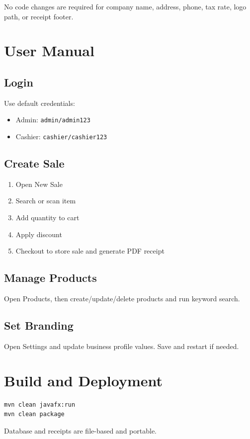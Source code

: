 \documentclass[12pt]{article}
\begin{document}
No code changes are required for company name, address, phone, tax rate, logo path, or receipt footer.

\section{User Manual}
\subsection{Login}
Use default credentials:
\begin{itemize}[leftmargin=*]
    \item Admin: \texttt{admin/admin123}
    \item Cashier: \texttt{cashier/cashier123}
\end{itemize}

\subsection{Create Sale}
\begin{enumerate}[leftmargin=*]
    \item Open New Sale
    \item Search or scan item
    \item Add quantity to cart
    \item Apply discount
    \item Checkout to store sale and generate PDF receipt
\end{enumerate}

\subsection{Manage Products}
Open Products, then create/update/delete products and run keyword search.

\subsection{Set Branding}
Open Settings and update business profile values. Save and restart if needed.

\section{Build and Deployment}
\begin{verbatim}
mvn clean javafx:run
mvn clean package
\end{verbatim}

Database and receipts are file-based and portable.
\end{document}
